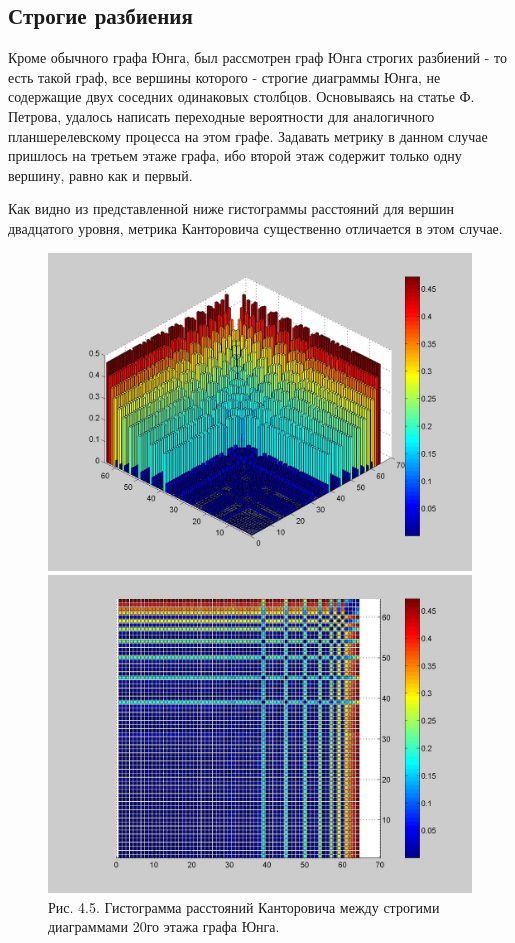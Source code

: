 \documentclass[12pt]{report}
\begin{document}
\subsection*{Строгие разбиения}
\hspace{\parindent} Кроме обычного графа Юнга, был рассмотрен граф Юнга строгих разбиений - то есть такой граф, все вершины которого - строгие диаграммы Юнга, не содержащие двух соседних одинаковых столбцов. Основываясь на статье Ф. Петрова, удалось написать переходные вероятности для аналогичного планшерелевскому процесса на этом графе. Задавать метрику в данном случае пришлось на третьем этаже графа, ибо второй этаж содержит только одну вершину, равно как и первый. 

Как видно из представленной ниже гистограммы расстояний для вершин двадцатого уровня, метрика Канторовича существенно отличается в этом случае. 
\begin{figure}[!ht]
\begin{center}
\includegraphics[scale=0.2]{metricHistStrict}
\includegraphics[scale=0.2]{metricHistStrict2}
\\Рис. 4.5. Гистограмма расстояний Канторовича между строгими диаграммами 20го этажа графа Юнга. 
\end{center}
\end{figure}
\end{document}
